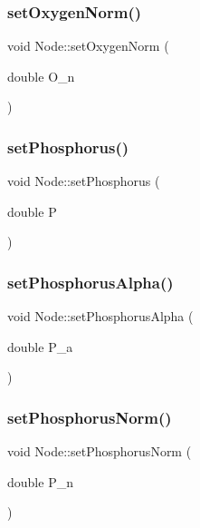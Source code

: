 \subsubsection{\texorpdfstring{setOxygenNorm()}{setOxygenNorm()}}
{\footnotesize\ttfamily void Node\+::set\+Oxygen\+Norm (\begin{DoxyParamCaption}\item[{double}]{O\+\_\+n }\end{DoxyParamCaption})\hspace{0.3cm}{\ttfamily [inline]}}

\mbox{\label{class_node_a3bb891cf14f9e23ba347562f4f63a660}} 
\subsubsection{\texorpdfstring{setPhosphorus()}{setPhosphorus()}}
{\footnotesize\ttfamily void Node\+::set\+Phosphorus (\begin{DoxyParamCaption}\item[{double}]{P }\end{DoxyParamCaption})\hspace{0.3cm}{\ttfamily [inline]}}

\mbox{\label{class_node_a5b80655f432a07064c839e7d21558694}} 
\subsubsection{\texorpdfstring{setPhosphorusAlpha()}{setPhosphorusAlpha()}}
{\footnotesize\ttfamily void Node\+::set\+Phosphorus\+Alpha (\begin{DoxyParamCaption}\item[{double}]{P\+\_\+a }\end{DoxyParamCaption})\hspace{0.3cm}{\ttfamily [inline]}}

\mbox{\label{class_node_a41a38a1054027e405921301b9fe127e7}} 
\subsubsection{\texorpdfstring{setPhosphorusNorm()}{setPhosphorusNorm()}}
{\footnotesize\ttfamily void Node\+::set\+Phosphorus\+Norm (\begin{DoxyParamCaption}\item[{double}]{P\+\_\+n }\end{DoxyParamCaption})\hspace{0.3cm}{\ttfamily [inline]}}

